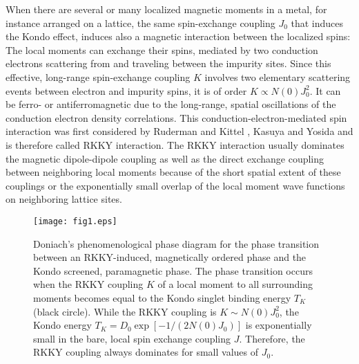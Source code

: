 \documentclass[12pt,twoside]{article}
\begin{document}
When there are several or many localized magnetic moments in a metal, 
for instance arranged on a lattice, the same spin-exchange coupling $J_0$ 
that induces the Kondo effect, induces also a magnetic interaction between 
the localized spins:
The local moments can exchange their spins, mediated by two conduction 
electrons scattering from and traveling between the impurity sites.
Since this effective, long-range spin-exchange coupling $K$ involves 
two elementary scattering events between electron and impurity spins, 
it is of order $K\propto N(0)J_0^2$.
It can be ferro- or antiferromagnetic due to the 
long-range, spatial oscillations of the conduction electron
density correlations. This conduction-electron-mediated spin 
interaction was first considered by Ruderman and Kittel \cite{Ruderman54},
Kasuya \cite{Kasuya56} and Yosida \cite{Yosida57} and is therefore 
called RKKY interaction. 
The RKKY interaction usually dominates the magnetic dipole-dipole
coupling as well as the direct exchange coupling 
between neighboring local moments because of the short spatial extent of these 
couplings or the exponentially small overlap of the local moment wave 
functions on neighboring lattice sites.

\begin{figure}
\centering
\texttt{[image: fig1.eps]}
\caption{Doniach's phenomenological phase diagram 
for the phase transition between an RKKY-induced, magnetically ordered phase 
and the Kondo screened, paramagnetic phase. 
The phase transition occurs when the RKKY coupling $K$
of a local moment to all surrounding moments becomes equal to the Kondo 
singlet binding energy $T_K$ (black circle). 
While the RKKY coupling is $K\sim N(0)J_0^2$,
the Kondo energy $T_K=D_0\exp [-1/(2N(0)J_0)]$ is exponentially small in
the bare, local spin exchange coupling $J$. 
Therefore, the RKKY coupling always dominates for small values of $J_0$.   
\label{fig:doniach}
}
\end{figure}
\end{document}
